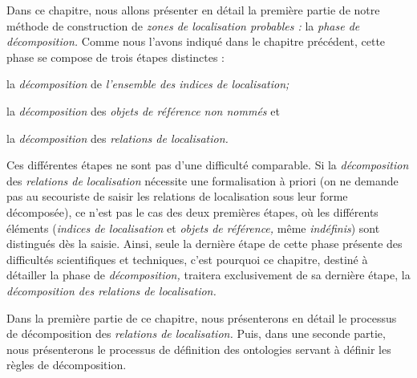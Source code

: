Dans ce chapitre, nous allons présenter en détail la première partie
de notre méthode de construction de \emph{zones de localisation
  probables :} la \emph{phase de décomposition.} Comme nous l'avons
indiqué dans le chapitre précédent, cette phase se compose de trois
étapes distinctes :
%
\begin{enumerate*}[label=(\alph*)]
\item la \emph{décomposition} de \emph{l'ensemble des indices de
    localisation;}
\item la \emph{décomposition} des \emph{objets de référence non
    nommés} et
\item la \emph{décomposition} des \emph{relations de localisation.}
\end{enumerate*}
%
Ces différentes étapes ne sont pas d'une difficulté comparable. Si la
\emph{décomposition} des \emph{relations de localisation} nécessite
une formalisation à priori (on ne demande pas au secouriste de saisir
les relations de localisation sous leur forme décomposée), ce n'est
pas le cas des deux premières étapes, où les différents éléments
(\emph{indices de localisation} et \emph{objets de référence,} même
\emph{indéfinis}) sont distingués dès la saisie. Ainsi, seule la
dernière étape de cette phase présente des difficultés scientifiques
et techniques, c'est pourquoi ce chapitre, destiné à détailler la
phase de \emph{décomposition,} traitera exclusivement de sa dernière
étape, la \emph{décomposition des relations de localisation.}

Dans la première partie de ce chapitre, nous présenterons en détail le
processus de décomposition des \emph{relations de localisation.} Puis,
dans une seconde partie, nous présenterons le processus de définition
des ontologies servant à définir les règles de décomposition.

